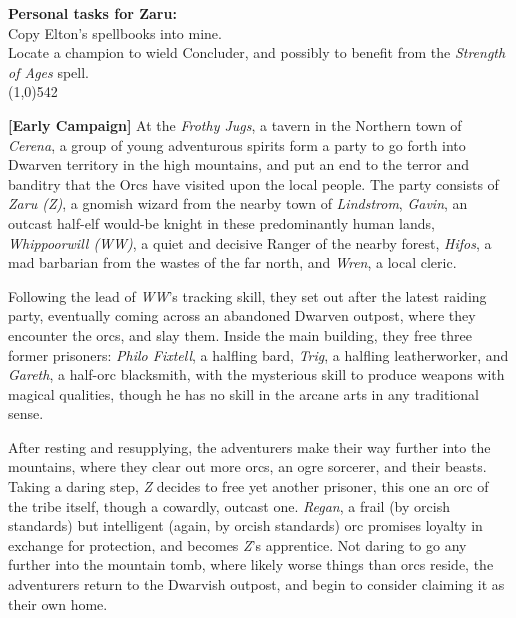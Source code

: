 \documentclass[letterpaper]{article}
\newcommand{\fullline}{\noindent\line(1,0){542} \\}
\begin{document}
\noindent\textbf{Personal tasks for Zaru:}\\
Copy Elton's spellbooks into mine.\\
Locate a champion to wield Concluder, and possibly to benefit from the \emph{Strength of Ages} spell.\\

\vspace{-1.75em}
\fullline
\vspace{-1.5em}

\textbf{[Early Campaign]} At the \emph{Frothy Jugs}, a tavern in the Northern town of \emph{Cerena}, a group of young adventurous spirits form a party to go forth into Dwarven territory in the high mountains, and put an end to the terror and banditry that the Orcs have visited upon the local people. The party consists of \emph{Zaru (Z)}, a gnomish wizard from the nearby town of \emph{Lindstrom}, \emph{Gavin}, an outcast half-elf would-be knight in these predominantly human lands, \emph{Whippoorwill (WW)}, a quiet and decisive Ranger of the nearby forest, \emph{Hifos}, a mad barbarian from the wastes of the far north, and \emph{Wren}, a local cleric.\par
Following the lead of \emph{WW}'s tracking skill, they set out after the latest raiding party, eventually coming across an abandoned Dwarven outpost, where they encounter the orcs, and slay them.  Inside the main building, they free three former prisoners: \emph{Philo Fixtell}, a halfling bard, \emph{Trig}, a halfling leatherworker, and \emph{Gareth}, a half-orc blacksmith, with the mysterious skill to produce weapons with magical qualities, though he has no skill in the arcane arts in any traditional sense.\par
After resting and resupplying, the adventurers make their way further into the mountains, where they clear out more orcs, an ogre sorcerer, and their beasts. Taking a daring step, \emph{Z} decides to free yet another prisoner, this one an orc of the tribe itself, though a cowardly, outcast one.  \emph{Regan}, a frail (by orcish standards) but intelligent (again, by orcish standards) orc promises loyalty in exchange for protection, and becomes \emph{Z}'s apprentice. Not daring to go any further into the mountain tomb, where likely worse things than orcs reside, the adventurers return to the Dwarvish outpost, and begin to consider claiming it as their own home.\\
\end{document}
